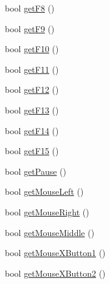 \begin{DoxyCompactItemize}
\item 
bool \hyperlink{class_update_data_af998602272cfaf1bff54a83eb8432fb2}{get\-F8} ()
\item 
bool \hyperlink{class_update_data_a49320803a615bffa3a12e9f09f71e58d}{get\-F9} ()
\item 
bool \hyperlink{class_update_data_aa97a34468f14a3838a24211dcb122d06}{get\-F10} ()
\item 
bool \hyperlink{class_update_data_a247aa9ae1940b485e1f8a51412e9fa5d}{get\-F11} ()
\item 
bool \hyperlink{class_update_data_a617b573c0d862f7084bba70b90a2e1b1}{get\-F12} ()
\item 
bool \hyperlink{class_update_data_a247d97fa5db9173ed37b16b8eb505d3b}{get\-F13} ()
\item 
bool \hyperlink{class_update_data_a4030602c3d5ac1037ccea57c7c1a331b}{get\-F14} ()
\item 
bool \hyperlink{class_update_data_a094ad4398217aa38fd671a985fc60880}{get\-F15} ()
\item 
bool \hyperlink{class_update_data_a4ade0efcb105d66a6d573ddc6d044979}{get\-Pause} ()
\item 
bool \hyperlink{class_update_data_a7505c6e459c53bbdb0812031e9a258c6}{get\-Mouse\-Left} ()
\item 
bool \hyperlink{class_update_data_a226c48dacf9b5309640a1a25583115b6}{get\-Mouse\-Right} ()
\item 
bool \hyperlink{class_update_data_ad35a1239212d0e498286ab0a4e9f14b0}{get\-Mouse\-Middle} ()
\item 
bool \hyperlink{class_update_data_a62a79016b1e473832d03ae46b89252ae}{get\-Mouse\-X\-Button1} ()
\item 
bool \hyperlink{class_update_data_a3a72e28655b87878de8dafbf07b7d344}{get\-Mouse\-X\-Button2} ()
\end{DoxyCompactItemize}
